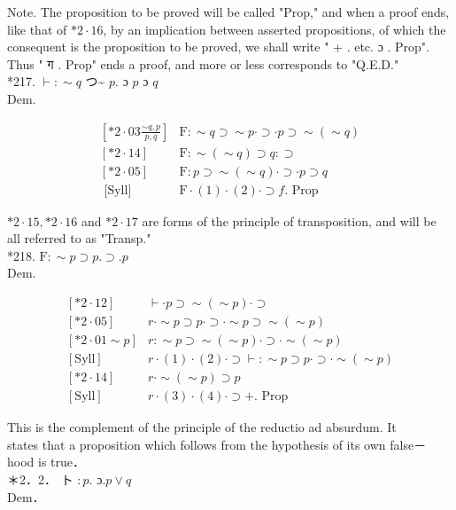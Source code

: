 \documentclass[10pt]{article}
\begin{document}
Note. The proposition to be proved will be called "Prop," and when a proof ends, like that of $* 2 \cdot 16$, by an implication between asserted propositions, of which the consequent is the proposition to be proved, we shall write " + . etc. ɔ . Prop". Thus " ग . Prop" ends a proof, and more or less corresponds to "Q.E.D."\\
*217. $\vdash: \sim q$ つ\~{} $p$. ɔ $p$ ɔ $q$\\
Dem.

\[
\begin{array}{ll}
{\left[* 2 \cdot 03 \frac{\sim q, p}{p, q}\right]} & \mathrm{F}: \sim q \supset \sim p \cdot \supset \cdot p \supset \sim(\sim q) \\
{[* 2 \cdot 14]} & \mathrm{F}: \sim(\sim q) \supset q: \supset \\
{[* 2 \cdot 05]} & \mathrm{F}: p \supset \sim(\sim q) \cdot \supset \cdot p \supset q  \tag{2}\\
\text { [Syll] } & \mathrm{F} \cdot(1) \cdot(2) \cdot \supset f . \text { Prop }
\end{array}
\]

$* 2 \cdot 15, * 2 \cdot 16$ and $* 2 \cdot 17$ are forms of the principle of transposition, and will be all referred to as "Transp."\\
*218. $\mathrm{F}: \sim p \supset p . \supset . p$\\
Dem.

\[
\begin{array}{ll}
{[* 2 \cdot 12]} & \vdash \cdot p \supset \sim(\sim p) \cdot \supset \\
{[* 2 \cdot 05]} & r \cdot \sim p \supset p \cdot \supset \cdot \sim p \supset \sim(\sim p) \\
{[* 2 \cdot 01 \sim p]} & r: \sim p \supset \sim(\sim p) \cdot \supset \cdot \sim(\sim p) \\
{[\mathrm{Syll}]} & r \cdot(1) \cdot(2) \cdot \supset \vdash: \sim p \supset p \cdot \supset \cdot \sim(\sim p) \\
{[* 2 \cdot 14]} & r \cdot \sim(\sim p) \supset p  \tag{4}\\
{[\mathrm{Syll}]} & r \cdot(3) \cdot(4) \cdot \supset+. \text { Prop }
\end{array}
\]

This is the complement of the principle of the reductio ad absurdum. It\\
states that a proposition which follows from the hypothesis of its own false－ hood is true．\\
＊2．2． ト $: p$. ɔ.$p \vee q$\\
Dem．
\end{document}
